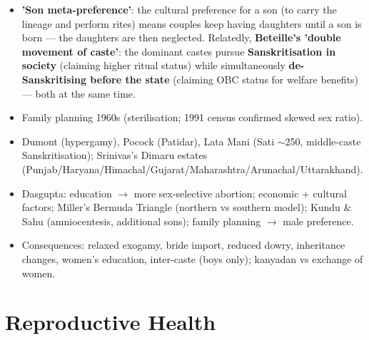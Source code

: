 \begin{KeyConcept}
\begin{itemize}
\item \textbf{'Son meta-preference'}: the cultural preference for a son (to carry the lineage and perform rites) means couples keep having daughters until a son is born --- the daughters are then neglected. Relatedly, \textbf{Beteille's 'double movement of caste'}: the dominant castes pursue \textbf{Sanskritisation in society} (claiming higher ritual status) while simultaneously \textbf{de-Sanskritising before the state} (claiming OBC status for welfare benefits) --- both at the same time.
\end{itemize}
\end{KeyConcept}

\begin{QuickRevision}
\begin{itemize}
\item Family planning 1960s (sterilisation; 1991 census confirmed skewed sex ratio).
\item Dumont (hypergamy), Pocock (Patidar), Lata Mani (Sati $\sim$250, middle-caste Sanskritisation); Srinivas's Dimaru estates (Punjab/Haryana/Himachal/Gujarat/Maharashtra/Arunachal/Uttarakhand).
\item Dasgupta: education $\rightarrow$ more sex-selective abortion; economic + cultural factors; Miller's Bermuda Triangle (northern vs southern model); Kundu \& Sahu (amniocentesis, additional sons); family planning $\rightarrow$ male preference.
\item Consequences: relaxed exogamy, bride import, reduced dowry, inheritance changes, women's education, inter-caste (boys only); kanyadan vs exchange of women.
\end{itemize}
\end{QuickRevision}

\section{Reproductive Health}

